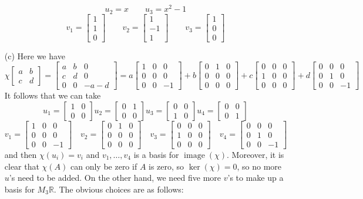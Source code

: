 \documentclass{amsart}
\newcommand{\R}         {{\mathbb{R}}}
\newcommand{\img}       {\operatorname{image}}
\newcommand{\bsm}       {\left[\begin{smallmatrix}}
\newcommand{\esm}       {\end{smallmatrix}\right]}
\renewcommand{\:}       {\colon}
\theoremstyle{definition}
\renewenvironment{solution}{\SolutionAtEnd}{\endSolutionAtEnd}
\begin{document}
\begin{solution}
\begin{itemize}
\[      u_2 = x\hspace{2em}
      u_3 = x^2-1 
   \]
   \[ v_1 = \bsm 1\\1\\0 \esm \hspace{2em}
      v_2 = \bsm 1\\-1\\1 \esm \hspace{2em}
      v_3 = \bsm 1\\0\\0\esm
   \]
  \item[(c)] Here we have
   {\tiny \[ \chi\bsm a&b\\ c&d\esm = 
       \bsm a & b & 0 \\ c & d & 0 \\ 0 & 0 & -a-d\esm =
       a\bsm 1&0&0\\0&0&0\\0&0&-1\esm + 
       b\bsm 0&1&0\\0&0&0\\0&0&0 \esm + 
       c\bsm 0&0&0\\1&0&0\\0&0&0\esm + 
       d\bsm 0&0&0\\0&1&0\\0&0&-1\esm
   \]}
   It follows that we can take
   \[ u_1 = \bsm 1&0\\0&0 \esm 
      u_2 = \bsm 0&1\\0&0 \esm 
      u_3 = \bsm 0&0\\1&0 \esm 
      u_4 = \bsm 0&0\\0&1 \esm 
   \]
   \[  v_1 = \bsm 1&0&0\\0&0&0\\0&0&-1\esm \hspace{1em}
       v_2 = \bsm 0&1&0\\0&0&0\\0&0&0 \esm \hspace{1em}
       v_3 = \bsm 0&0&0\\1&0&0\\0&0&0\esm \hspace{1em}
       v_4 = \bsm 0&0&0\\0&1&0\\0&0&-1\esm
   \]
   and then $\chi(u_i)=v_i$ and $v_1,\dotsc,v_4$ is a basis
   for $\img(\chi)$.  Moreover, it is clear that $\chi(A)$
   can only be zero if $A$ is zero, so $\ker(\chi)=0$, so no
   more $u$'s need to be added.  On the other hand, we need
   five more $v$'s to make up a basis for $M_3\R$.  The
   obvious choices are as follows:

\end{itemize}
\end{solution}
\end{document}

